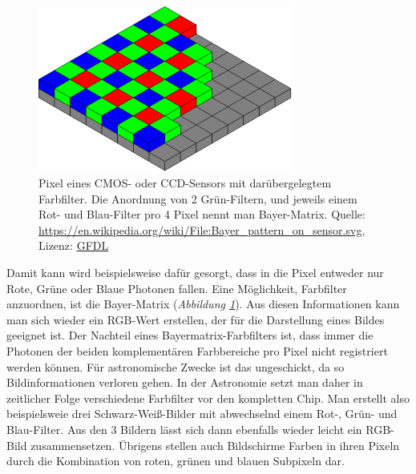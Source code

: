 \documentclass[10pt,a4paper,titlepage]{article}
\begin{document}
\begin{figure}[h!]
  \centering
    \includegraphics[width=0.75\textwidth]{Bayer-Matrix}
  \caption{Pixel eines CMOS- oder CCD-Sensors mit darübergelegtem Farbfilter. Die Anordnung von 2 Grün-Filtern, und jeweils einem Rot- und Blau-Filter pro 4 Pixel nennt man Bayer-Matrix. Quelle: \url{https://en.wikipedia.org/wiki/File:Bayer_pattern_on_sensor.svg}, Lizenz: \href{http://www.selflinux.org/selflinux/html/gfdl_de.html}{GFDL}}
  \label{fig:bayermatrix}
\end{figure}
Damit kann wird beispielsweise dafür gesorgt, dass in die Pixel entweder nur Rote, Grüne oder Blaue Photonen fallen. Eine Möglichkeit, Farbfilter anzuordnen, ist die Bayer-Matrix (\textit{Abbildung \ref{fig:bayermatrix}}). Aus diesen Informationen kann man sich wieder ein RGB-Wert erstellen, der für die Darstellung eines Bildes geeignet ist. Der Nachteil eines Bayermatrix-Farbfilters ist, dass immer die Photonen der beiden komplementären Farbbereiche pro Pixel nicht registriert werden können. Für astronomische Zwecke ist das ungeschickt, da so Bildinformationen verloren gehen. In der Astronomie setzt man daher in zeitlicher Folge verschiedene Farbfilter vor den kompletten Chip. Man erstellt also beispielsweie drei Schwarz-Weiß-Bilder mit abwechselnd einem Rot-, Grün- und Blau-Filter. Aus den 3 Bildern lässt sich dann ebenfalls wieder leicht ein RGB-Bild zusammensetzen. Übrigens stellen auch Bildschirme Farben in ihren Pixeln durch die Kombination von roten, grünen und blauen Subpixeln dar.

\noindent{}
\end{document}
